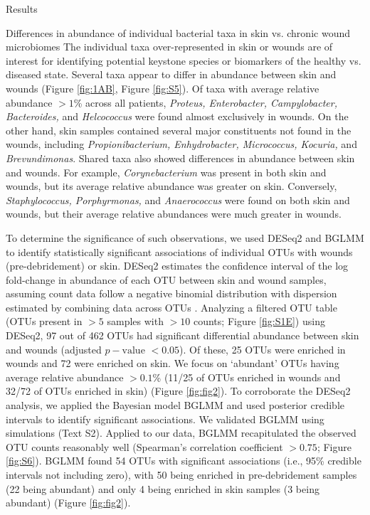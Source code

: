 \documentclass[oneside,12pt,final]{sty/ucthesis-CA2012}
\begin{document}
\begin{mainmatter}
\begin{section}{Results}
\begin{subsection}{Differences in abundance of individual bacterial taxa in skin vs. chronic wound microbiomes}
The individual taxa over-represented in skin or wounds are of interest for identifying potential keystone species or biomarkers of the healthy vs. diseased state. Several taxa appear to differ in abundance between skin and wounds (Figure \ref{fig:1AB}, Figure \ref{fig:S5}). Of taxa with average relative abundance $>1$\% across all patients, \textit{Proteus, Enterobacter, Campylobacter, Bacteroides,} and \textit{Helcococcus} were found almost exclusively in wounds. On the other hand, skin samples contained several major constituents not found in the wounds, including \textit{Propionibacterium, Enhydrobacter, Micrococcus, Kocuria,} and \textit{Brevundimonas}. Shared taxa also showed differences in abundance between skin and wounds. For example, \textit{Corynebacterium} was present in both skin and wounds, but its average relative abundance was greater on skin. Conversely, \textit{Staphylococcus, Porphyrmonas,} and \textit{Anaerococcus} were found on both skin and wounds, but their average relative abundances were much greater in wounds.

To determine the significance of such observations, we used DESeq2 and BGLMM to identify statistically significant associations of individual OTUs with wounds (pre-debridement) or skin. DESeq2 estimates the confidence interval of the log fold-change in abundance of each OTU between skin and wound samples, assuming count data follow a negative binomial distribution with dispersion estimated by combining data across OTUs \cite{RN32}. Analyzing a filtered OTU table (OTUs present in $>5$ samples with $>10$ counts; Figure \ref{fig:S1E}) using DESeq2, 97 out of 462 OTUs had significant differential abundance between skin and wounds (adjusted $p-\text{value } < 0.05$). Of these, 25 OTUs were enriched in wounds and 72 were enriched on skin. We focus on ‘abundant’ OTUs having average relative abundance $> 0.1$\% (11/25 of OTUs enriched in wounds and 32/72 of OTUs enriched in skin) (Figure \ref{fig:fig2}). To corroborate the DESeq2 analysis, we applied the Bayesian model BGLMM and used posterior credible intervals to identify significant associations. We validated BGLMM using simulations (Text S2). Applied to our data, BGLMM recapitulated the observed OTU counts reasonably well (Spearman’s correlation coefficient $> 0.75$; Figure \ref{fig:S6}). BGLMM found 54 OTUs with significant associations (i.e., 95\% credible intervals not including zero), with 50 being enriched in pre-debridement samples (22 being abundant) and only 4 being enriched in skin samples (3 being abundant) (Figure \ref{fig:fig2}). 


\end{subsection}
\end{section}
\end{mainmatter}
\end{document}
